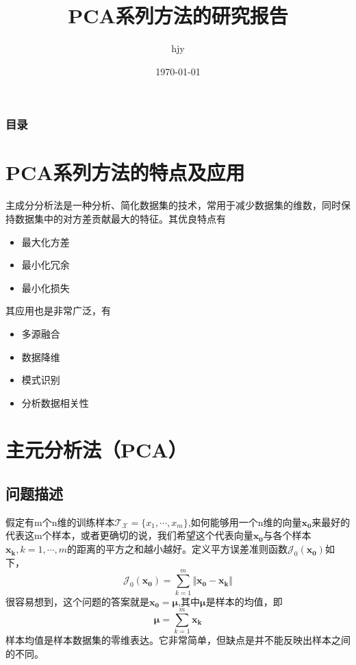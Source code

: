 \documentclass[12pt,a4paper,CJK]{beamer}
\author{hjy}
\title{PCA系列方法的研究报告}
\institute{TongJi University}
\date{\today}
\begin{document}
\begin{CJK*}{UTF8}{gkai}
\begin{frame} 				
	\titlepage 
\end{frame}
	
\begin{frame}
	\frametitle{目录}
	\tableofcontents
\end{frame}
  
  
\section{PCA系列方法的特点及应用}
\begin{frame}{\secname}
主成分分析法是一种分析、简化数据集的技术，常用于减少数据集的维数，同时保持数据集中的对方差贡献最大的特征。其优良特点有
	\begin{itemize}
	\item 最大化方差
	\item 最小化冗余
	\item 最小化损失
	\end{itemize}
其应用也是非常广泛，有
\begin{itemize}
\item 多源融合
\item 数据降维
\item 模式识别
\item 分析数据相关性
\end{itemize}
\end{frame}

\section{主元分析法（PCA）}
\subsection{问题描述}
\begin{frame}{\subsecname}
假定有m个n维的训练样本$\mathcal{T_X}=\{x_1,\cdots,x_m\}$,如何能够用一个n维的向量$\boldsymbol{x_0}$来最好的代表这m个样本，或者更确切的说，我们希望这个代表向量$\boldsymbol{x_0}$与各个样本$\boldsymbol{x_k},k=1,\cdots,m$的距离的平方之和越小越好。定义平方误差准则函数$\mathcal{J}_0(\boldsymbol{x_0})$如下，
\begin{equation}
\mathcal{J}_0(\boldsymbol{x_0})=\sum_{k=1}^{m}\Vert\boldsymbol{x_0}-\boldsymbol{x_k}\Vert
\end{equation}
很容易想到，这个问题的答案就是$\boldsymbol{x_0}=\boldsymbol{\mu}$,其中$\boldsymbol{\mu}$是样本的均值，即
\begin{equation}
\boldsymbol{\mu}=\sum_{k=1}^{m}\boldsymbol{x_k}
\end{equation}
样本均值是样本数据集的零维表达。它非常简单，但缺点是并不能反映出样本之间的不同。
\end{frame}



\end{CJK*}
\end{document}
